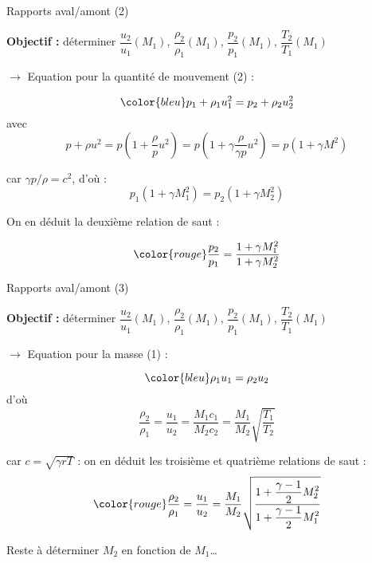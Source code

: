 \begin{frame}{Rapports aval/amont (2)}

\small

\textbf{Objectif :} 
déterminer $\dfrac{u_2}{u_1}(M_1)$, $\dfrac{\rho_2}{\rho_1}(M_1)$, 
$\dfrac{p_2}{p_1}(M_1)$, $\dfrac{T_2}{T_1}(M_1)$

\bigskip

\pause

$\rightarrow$ Equation pour la quantité de mouvement (2) : 

\[ \color{bleu}
	p_1 + \rho_1 u_1^2 = p_2 + \rho_2 u_2^2
\]
\pause
avec
\[
p+\rho u^2 = p\left ( 1 + \frac{\rho}{p} u^2 \right )
= p\left ( 1 + \gamma \frac{\rho}{\gamma p} u^2 \right ) = p\left ( 1 + \gamma M^2 \right )
\]

car $\gamma p / \rho = c^2$\pause, 
d'où :
\[
	p_1\left ( 1 + \gamma M_1^2 \right ) = p_2\left ( 1 + \gamma M_2^2 \right )
\]

\pause
\medskip
On en déduit la deuxième relation de saut :

\begin{equation}
	\color{rouge}
	\frac{p_2}{p_1} = \frac{1 + \gamma M_1^2}{1 + \gamma M_2^2}
\end{equation}


\vspace{20mm}

\end{frame}

\begin{frame}{Rapports aval/amont (3)}

\small

\textbf{Objectif :} 
déterminer $\dfrac{u_2}{u_1}(M_1)$, $\dfrac{\rho_2}{\rho_1}(M_1)$, 
$\dfrac{p_2}{p_1}(M_1)$, $\dfrac{T_2}{T_1}(M_1)$

\bigskip

\pause

$\rightarrow$ Equation pour la masse (1) : 

\[ \color{bleu}
	\rho_1 u_1 = \rho_2 u_2
\]
\pause
d'où
\[
\frac{\rho_2}{\rho_1} = \frac{u_1}{u_2} = \frac{M_1c_1}{M_2c_2} = \frac{M_1}{M_2} \sqrt{\frac{T_1}{T_2}}
\]

car $c = \sqrt{\gamma r T}$ \pause: 
on en déduit les troisième et quatrième relations de saut :
\begin{equation}
	\color{rouge}
	\frac{\rho_2}{\rho_1} = \frac{u_1}{u_2} = \frac{M_1}{M_2} 
	\sqrt{\frac{1 + \dfrac{\gamma - 1}{2} M_2^2}{1 + \dfrac{\gamma - 1}{2} M_1^2}}
\end{equation}

\pause
Reste à déterminer $M_2$ en fonction de $M_1$\ldots

\vspace{19mm}

\end{frame}


